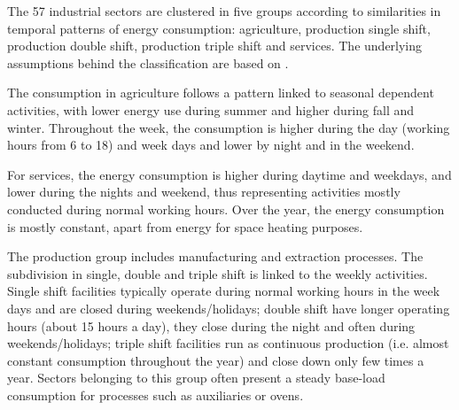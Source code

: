 \documentclass[review]{elsarticle}
\begin{document}
The 57 industrial sectors are clustered in five groups according to similarities in temporal patterns of energy consumption: agriculture, production single shift, production double shift, production triple shift and services. The underlying assumptions behind the classification are based on \cite{VM2016,Wiese2017}.

The consumption in agriculture follows a pattern linked to seasonal dependent activities, with lower energy use during summer and higher during fall and winter. Throughout the week, the consumption is higher during the day (working hours from 6 to 18) and week days and lower by night and in the weekend.

For services, the energy consumption is higher during daytime and weekdays, and lower during the nights and weekend, thus representing activities mostly conducted during normal working hours. Over the year, the energy consumption is mostly constant, apart from energy for space heating purposes.

The production group includes manufacturing and extraction processes. The subdivision in single, double and triple shift is linked to the weekly activities. Single shift facilities typically operate during normal working hours in the week days and are closed during weekends/holidays; double shift have longer operating hours (about 15 hours a day), they close during the night and often during weekends/holidays;
triple shift facilities run as continuous production (i.e. almost constant consumption throughout the year) and close down only few times a year. 
Sectors belonging to this group often present a steady base-load consumption for processes such as auxiliaries or ovens. \\
\end{document}

